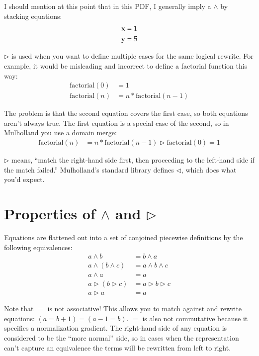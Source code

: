 \documentclass{report}
\begin{document}
    I should mention at this point that in this PDF, I generally imply a $\wedge$ by stacking equations:
\begin{align*}
\textrm x & = 1 \\
\textrm y & = 5
\end{align*}

    $\rhd$ is used when you want to define multiple cases for the same logical rewrite. For example, it would be misleading and incorrect to define a factorial function this way:
\begin{align*}
\textrm{factorial}(0) & = 1 \\
\textrm{factorial}(n) & = n * \textrm{factorial}(n - 1)
\end{align*}

    The problem is that the second equation covers the first case, so both equations aren't always true. The first equation is a special case of the second, so in Mulholland you use a domain
    merge:
\begin{align*}
\textrm{factorial}(n) & = n * \textrm{factorial}(n - 1) \rhd \textrm{factorial}(0) = 1
\end{align*}

    $\rhd$ means, ``match the right-hand side first, then proceeding to the left-hand side if the match failed.'' Mulholland's standard library defines $\lhd$, which does what you'd expect.

\section{Properties of $\wedge$ and $\rhd$}
    Equations are flattened out into a set of conjoined piecewise definitions by the following equivalences:
\begin{align*}
a \wedge b            & = b \wedge a \\
a \wedge (b \wedge c) & = a \wedge b \wedge c \\
a \wedge a            & = a \\
a \rhd (b \rhd c)     & = a \rhd b \rhd c \\
a \rhd a              & = a
\end{align*}

    Note that $=$ is not associative! This allows you to match against and rewrite equations: $(a = b + 1) = (a - 1 = b)$. $=$ is also not commutative because it specifies a normalization
    gradient. The right-hand side of any equation is considered to be the ``more normal'' side, so in cases when the representation can't capture an equivalence the terms will be rewritten
    from left to right.
\end{document}
